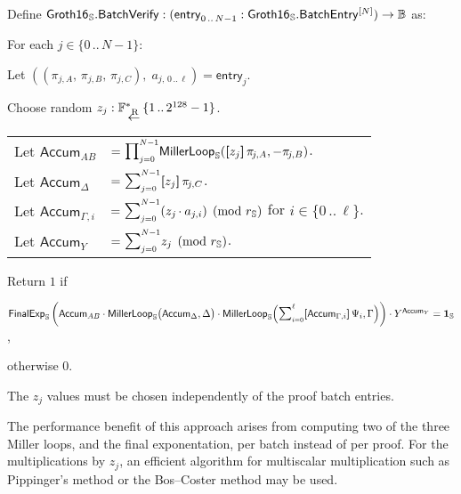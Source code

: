 \documentclass{article}
\newcommand{\tab}{\hspace{1.5em}}
\newcommand{\typecolon}{:}
\newcommand{\bit}{\mathbb{B}}
\newcommand{\Fieldstar}[1]{\mathbb{F}^\ast_{#1}}
\newcommand{\typeexp}[2]{{#1}\vphantom{)}^{[{#2}]}}
\newcommand{\setof}[1]{\{{#1}\}}
\newcommand{\barerange}[2]{{{#1}\,..\,{#2}}}
\newcommand{\range}[2]{\setof{\barerange{#1}{#2}}}
\newcommand{\sop}[3]{\!\scalebox{0.89}{$\scalebox{1.404}{$\strut#3$}_{#1}^{#2}$}}
\newcommand{\ssum}[2]{\sop{#1}{#2}{\sum}}
\newcommand{\sproduct}[2]{\sop{#1}{#2}{\prod}}
\newcommand{\mult}{\cdot}
\newcommand{\scalarmult}[2]{\boldsymbol{[}{#1}\boldsymbol{]}\,{#2}}
\newcommand{\clasp}[3][0pt]{\stackengine{0pt}{#3}{\kern#1#2}{O}{c}{F}{F}{L}}
\newcommand{\leftarrowR}{\mathop{\clasp[0.15em]{\raisebox{1.15ex}{\scriptsize R}}{$\,\leftarrow\,$}}}
\newcommand{\Entry}[1]{\mathsf{entry}_{#1}}
\newcommand{\Groth}{\mathsf{Groth16}}
\newcommand{\GrothS}{\Groth_{\kern 0.05em\mathbb{S}}}
\newcommand{\GrothSBatchEntry}{\GrothS\mathsf{.BatchEntry}}
\newcommand{\GrothSBatchVerify}{\GrothS\mathsf{.BatchVerify}}
\newcommand{\Proof}[1]{\pi_{\!{#1}}}
\newcommand{\Accum}[1]{\mathsf{Accum}_{#1}}
\newcommand{\ParamS}[1]{{{#1}_\mathbb{\hskip 0.03em S}}}
\newcommand{\OneS}{\ParamS{\mathbf{1}}}
\newcommand{\MillerLoopS}{\ParamS{\mathsf{MillerLoop}}}
\newcommand{\FinalExpS}{\ParamS{\mathsf{FinalExp}}}
\begin{document}
Define $\GrothSBatchVerify \typecolon (\Entry{\barerange{0}{N-1}} \typecolon \typeexp{\GrothSBatchEntry}{N})
                                       \rightarrow \bit$ as:
\begin{algorithm}
  \item For each $j \in \range{0}{N-1}$:
  \item \tab Let $((\Proof{j,A},\, \Proof{j,B},\, \Proof{j,C}),\; a_{j,\,\barerange{0}{\ell}}) = \Entry{j}$.
  \item \tab Choose random $z_j \typecolon \Fieldstar \leftarrowR \range{1}{2^{128}-1}$.
  \item \vspace{-2ex}
  \item \begin{tabular}{@{}l@{\;}l}
        Let $\Accum{AB}$       &$= \sproduct{j=0}{N-1}{\MillerLoopS(\scalarmult{z_j}{\Proof{j,A}}, -\Proof{j,B}})$. \\[1.5ex]
        Let $\Accum{\Delta}$   &$= \ssum{j=0}{N-1}{\scalarmult{z_j}{\Proof{j,C}}}$. \\[1.5ex]
        Let $\Accum{\Gamma,i}$ &$= \ssum{j=0}{N-1}{(z_j\kern-0.08em \mult a_{j,i}) \pmod{\ParamS{r}}}$ for $i \in \range{0}{\ell}$. \\[1.5ex]
        Let $\Accum{Y}$        &$= \ssum{j=0}{N-1}{z_j \pmod{\ParamS{r}}}$. \\[2.5ex]
        \end{tabular}
  \item Return $1$ if
        \vspace{1ex}
        \begin{formulae}
          \item $\FinalExpS\left(\Accum{AB} \mult \MillerLoopS\big(\Accum{\Delta}, \Delta\big) \mult
                                 \MillerLoopS\Big(\ssum{i=0}{\ell}{\scalarmult{\Accum{\Gamma,i}}{\Psi_i}}, \Gamma\Big)\right)
                 \mult Y^{\Accum{Y}} = \OneS$,
        \end{formulae}
        \vspace{-2ex}
        otherwise $0$.
\end{algorithm}

The $z_j$ values must be chosen independently of the proof batch entries.

The performance benefit of this approach arises from computing two of the three Miller loops, and
the final exponentation, per batch instead of per proof. For the multiplications by $z_j$, an efficient
algorithm for multiscalar multiplication such as Pippinger's method \cite{Bernstein2001} or the Bos--Coster
method \cite{deRooij1995} may be used.
\end{document}
